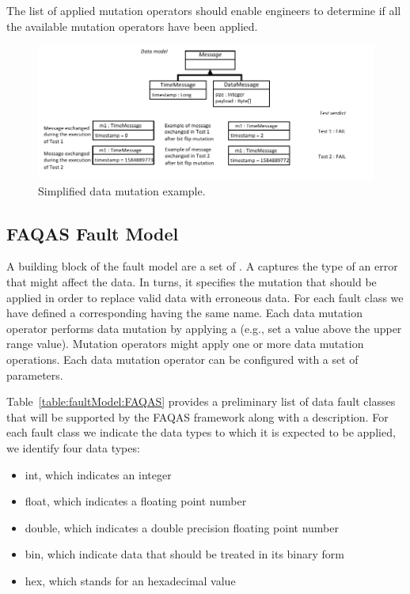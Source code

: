 The list of applied mutation operators should enable engineers to determine if all the available mutation operators have been applied.


\begin{figure}[t!]
  \centering
    \includegraphics{images/DataDrivenSimpleExample}
      \caption{Simplified data mutation example.}
      \label{fig:DataDrivenSimpleExample}
\end{figure}

\clearpage



\clearpage
\subsection{FAQAS Fault Model}
\label{sec:dataModel}
\label{sec:faultModel}





A building block of the fault model are a set of .
A   captures the type of an error that might affect the data. In turns, it specifies the mutation that should be applied in order to replace valid data with erroneous data. For each fault class we have defined a corresponding  having the same name. 
Each {data mutation operator} performs data mutation by applying a  (e.g., set a value above the upper range value). Mutation operators might apply one or more data mutation operations.
Each data mutation operator can be configured with a set of parameters. 

Table~\ref{table:faultModel:FAQAS} provides a preliminary list of data fault classes that will be supported by the FAQAS framework along with a description. For each fault class we indicate the data types to which it is expected to be applied, we identify four data types: 
\begin{itemize}
\item int, which indicates an integer
\item float, which indicates a floating point number
\item double, which indicates a double precision floating point number
\item bin, which indicate data that should be treated in its binary form
\item hex, which stands for an hexadecimal value
\end{itemize}

